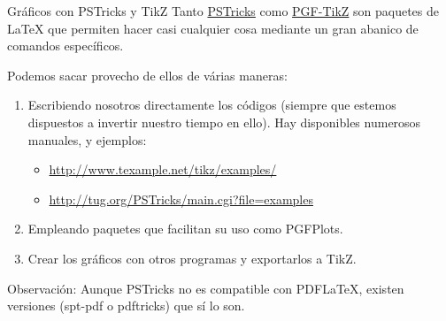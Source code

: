 \documentclass[10pt]{beamer}
\begin{document}
\begin{frame}[fragile]{Gr\'aficos con PSTricks y TikZ}
Tanto \href{http://www.ctan.org/pkg/pstricks}{\color{blue}PSTricks} como \href{http://www.texample.net/tikz/}{\color{blue}PGF-TikZ} son paquetes de LaTeX que permiten hacer casi cualquier cosa mediante un gran abanico de comandos espec\'ificos.

Podemos sacar provecho de ellos de v\'arias maneras:
\begin{enumerate}
\item Escribiendo nosotros directamente los c\'odigos (siempre que estemos dispuestos a invertir nuestro tiempo en ello). Hay disponibles numerosos manuales, y ejemplos:
\begin{itemize}
\item \href{http://www.texample.net/tikz/examples/}{\color{blue}http://www.texample.net/tikz/examples/}
\item \href{http://tug.org/PSTricks/main.cgi?file=examples}{\color{blue}http://tug.org/PSTricks/main.cgi?file=examples}
\end{itemize}
\item Empleando paquetes que facilitan su uso como PGFPlots.
\item Crear los gr\'aficos con otros programas y exportarlos a TikZ.
\end{enumerate}


\vspace{0.5cm}
{\small Observaci\'on:
Aunque PSTricks no es compatible con PDFLaTeX, existen versiones (spt-pdf o pdftricks)
que sí lo son.}
\end{frame}
\end{document}
